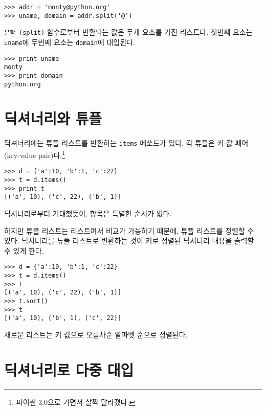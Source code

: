 \beforeverb
\begin{verbatim}
>>> addr = 'monty@python.org'
>>> uname, domain = addr.split('@')
\end{verbatim}
\afterverb
%

{\tt 분할 (split)} 함수로부터 반환되는 값은 두개 요소를 가진 리스트다. 
첫번째 요소는 {\tt uname}에 두번째 요소는 {\tt domain}에 대입된다.

\beforeverb
\begin{verbatim}
>>> print uname
monty
>>> print domain
python.org
\end{verbatim}
\afterverb
%

\section{딕셔너리와 튜플}


딕셔너리에는 튜플 리스트를 반환하는 {\tt items} 메쏘드가 있다. 
각 튜플은 키-값 페어(key-value pair)다.\footnote{파이썬 3.0으로 가면서 살짝 달라졌다.}

\beforeverb
\begin{verbatim}
>>> d = {'a':10, 'b':1, 'c':22}
>>> t = d.items()
>>> print t
[('a', 10), ('c', 22), ('b', 1)]
\end{verbatim}
\afterverb
%

딕셔너리로부터 기대했듯이, 항목은 특별한 순서가 없다.

하지만 튜플 리스트는 리스트여서 비교가 가능하기 때문에, 튜플 리스트를 정렬할 수 있다.
딕셔너리를 튜플 리스트로 변환하는 것이 키로 정렬된 딕셔너리 내용을 출력할 수 있게 한다.

\beforeverb
\begin{verbatim}
>>> d = {'a':10, 'b':1, 'c':22}
>>> t = d.items()
>>> t
[('a', 10), ('c', 22), ('b', 1)]
>>> t.sort()
>>> t
[('a', 10), ('b', 1), ('c', 22)]
\end{verbatim}
\afterverb
%

새로운 리스트는 키 값으로 오름차순 알파벳 순으로 정렬된다.

\section{딕셔너리로 다중 대입}


